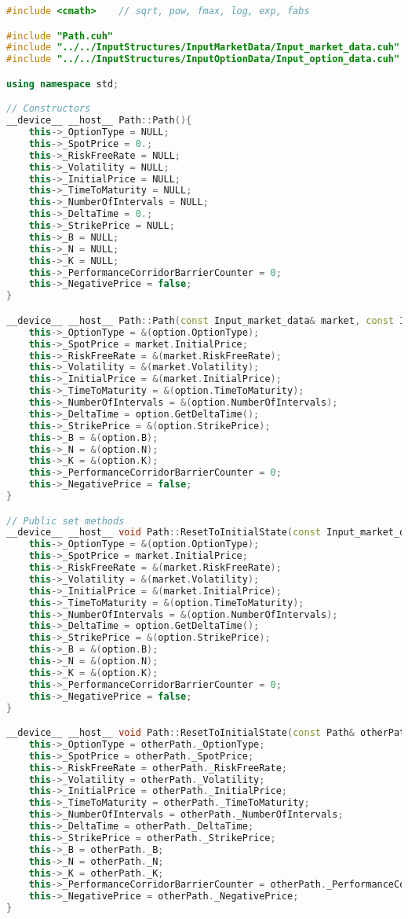 \begin{lstlisting}[language=C++, caption={\texttt{libraries/CoreLibraries/Path/Path.cu}}]
#include <cmath>	// sqrt, pow, fmax, log, exp, fabs

#include "Path.cuh"
#include "../../InputStructures/InputMarketData/Input_market_data.cuh"
#include "../../InputStructures/InputOptionData/Input_option_data.cuh"

using namespace std;

// Constructors
__device__ __host__ Path::Path(){
	this->_OptionType = NULL;
	this->_SpotPrice = 0.;
	this->_RiskFreeRate = NULL;
	this->_Volatility = NULL;
	this->_InitialPrice = NULL;
	this->_TimeToMaturity = NULL;
	this->_NumberOfIntervals = NULL;
	this->_DeltaTime = 0.;
	this->_StrikePrice = NULL;
	this->_B = NULL;
	this->_N = NULL;
	this->_K = NULL;
	this->_PerformanceCorridorBarrierCounter = 0;
	this->_NegativePrice = false;
}

__device__ __host__ Path::Path(const Input_market_data& market, const Input_option_data& option){
	this->_OptionType = &(option.OptionType);
	this->_SpotPrice = market.InitialPrice;
	this->_RiskFreeRate = &(market.RiskFreeRate);
	this->_Volatility = &(market.Volatility);
	this->_InitialPrice = &(market.InitialPrice);
	this->_TimeToMaturity = &(option.TimeToMaturity);
	this->_NumberOfIntervals = &(option.NumberOfIntervals);
	this->_DeltaTime = option.GetDeltaTime();
	this->_StrikePrice = &(option.StrikePrice);
	this->_B = &(option.B);
	this->_N = &(option.N);
	this->_K = &(option.K);
	this->_PerformanceCorridorBarrierCounter = 0;
	this->_NegativePrice = false;
}

// Public set methods
__device__ __host__ void Path::ResetToInitialState(const Input_market_data& market, const Input_option_data& option){
	this->_OptionType = &(option.OptionType);
	this->_SpotPrice = market.InitialPrice;
	this->_RiskFreeRate = &(market.RiskFreeRate);
	this->_Volatility = &(market.Volatility);
	this->_InitialPrice = &(market.InitialPrice);
	this->_TimeToMaturity = &(option.TimeToMaturity);
	this->_NumberOfIntervals = &(option.NumberOfIntervals);
	this->_DeltaTime = option.GetDeltaTime();
	this->_StrikePrice = &(option.StrikePrice);
	this->_B = &(option.B);
	this->_N = &(option.N);
	this->_K = &(option.K);
	this->_PerformanceCorridorBarrierCounter = 0;
	this->_NegativePrice = false;
}

__device__ __host__ void Path::ResetToInitialState(const Path& otherPath){
	this->_OptionType = otherPath._OptionType;
	this->_SpotPrice = otherPath._SpotPrice;
	this->_RiskFreeRate = otherPath._RiskFreeRate;
	this->_Volatility = otherPath._Volatility;
	this->_InitialPrice = otherPath._InitialPrice;
	this->_TimeToMaturity = otherPath._TimeToMaturity;
	this->_NumberOfIntervals = otherPath._NumberOfIntervals;
	this->_DeltaTime = otherPath._DeltaTime;
	this->_StrikePrice = otherPath._StrikePrice;
	this->_B = otherPath._B;
	this->_N = otherPath._N;
	this->_K = otherPath._K;
	this->_PerformanceCorridorBarrierCounter = otherPath._PerformanceCorridorBarrierCounter;
	this->_NegativePrice = otherPath._NegativePrice;
}


\end{lstlisting}
